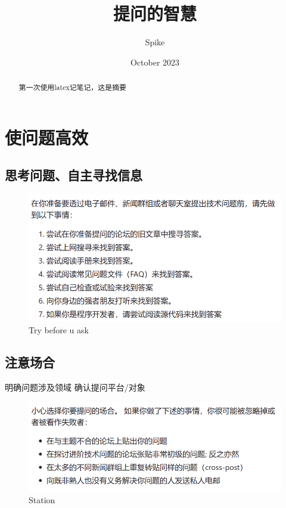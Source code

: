 \documentclass{article}
\title{提问的智慧}
\author{Spike}
\date{October 2023}
\begin{document}
\maketitle
\renewcommand{\contentsname}{目录}
\tableofcontents

\begin{abstract}
    第一次使用latex记笔记，这是摘要
\end{abstract}
\newpage
\section{使问题高效}
\subsection{思考问题、自主寻找信息}
\begin{figure}[h]
    \centering
    \includegraphics[width=18cm]{image_1.png}
    \caption{Try before u ask}
    \label{fig:enter-label}
\end{figure}

\subsection{注意场合}
明确问题涉及领域  确认提问平台/对象

\begin{figure}[h]
    \centering
    \includegraphics[width=18cm]{image_2.png}
    \caption{Station}
    \label{fig:enter-label}
\end{figure}
\end{document}
